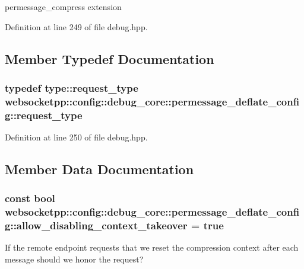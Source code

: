 permessage\+\_\+compress extension 

Definition at line 249 of file debug.\+hpp.



\subsection{Member Typedef Documentation}
\hypertarget{structwebsocketpp_1_1config_1_1debug__core_1_1permessage__deflate__config_aaf933a304bf66b1bdf5bec33fdf013a8}{}
\subsubsection[{request\+\_\+type}]{\setlength{\rightskip}{0pt plus 5cm}typedef {\bf type\+::request\+\_\+type} {\bf websocketpp\+::config\+::debug\+\_\+core\+::permessage\+\_\+deflate\+\_\+config\+::request\+\_\+type}}\label{structwebsocketpp_1_1config_1_1debug__core_1_1permessage__deflate__config_aaf933a304bf66b1bdf5bec33fdf013a8}


Definition at line 250 of file debug.\+hpp.



\subsection{Member Data Documentation}
\hypertarget{structwebsocketpp_1_1config_1_1debug__core_1_1permessage__deflate__config_a2c214b49d880b8ca1ebcce9c92d1dec6}{}
\subsubsection[{allow\+\_\+disabling\+\_\+context\+\_\+takeover}]{\setlength{\rightskip}{0pt plus 5cm}const bool websocketpp\+::config\+::debug\+\_\+core\+::permessage\+\_\+deflate\+\_\+config\+::allow\+\_\+disabling\+\_\+context\+\_\+takeover = true\hspace{0.3cm}{\ttfamily [static]}}\label{structwebsocketpp_1_1config_1_1debug__core_1_1permessage__deflate__config_a2c214b49d880b8ca1ebcce9c92d1dec6}
If the remote endpoint requests that we reset the compression context after each message should we honor the request? 

